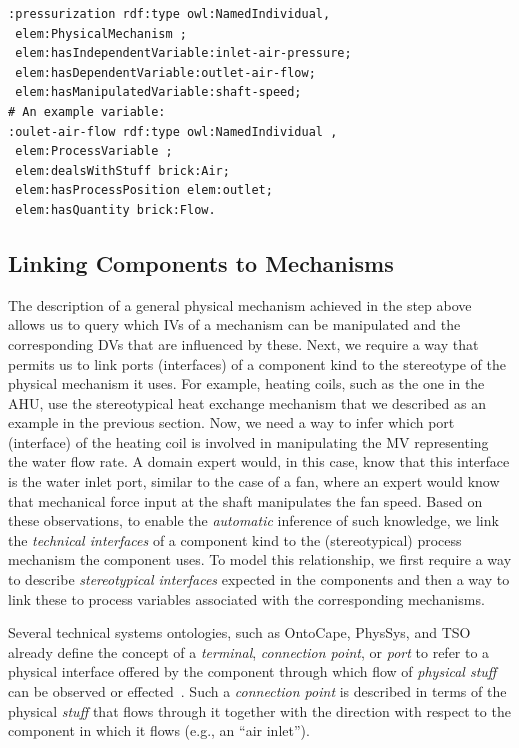 \documentclass[sigconf]{acmart}
\begin{document}
\begin{lstlisting}[language=SPARQL]
:pressurization rdf:type owl:NamedIndividual,
 elem:PhysicalMechanism ; 
 elem:hasIndependentVariable:inlet-air-pressure; 
 elem:hasDependentVariable:outlet-air-flow;
 elem:hasManipulatedVariable:shaft-speed;
# An example variable:
:oulet-air-flow rdf:type owl:NamedIndividual ,
 elem:ProcessVariable ;
 elem:dealsWithStuff brick:Air;
 elem:hasProcessPosition elem:outlet;
 elem:hasQuantity brick:Flow.
\end{lstlisting}

\subsection{Linking Components to Mechanisms}

The description of a general physical mechanism achieved in the step above allows us to query which IVs of a mechanism can be manipulated and the corresponding DVs that are influenced by these.
Next, we require a way that permits us to link ports (interfaces) of a component kind to the stereotype of the physical mechanism it uses. 
For example, heating coils, such as the one in the AHU, use the stereotypical heat exchange mechanism that we described as an example in the previous section.
Now, we need a way to infer which port (interface) of the heating coil is involved in manipulating the MV representing the water flow rate.
A domain expert would, in this case, know that this interface is the water inlet port, similar to the case of a fan, where an expert would know that mechanical force input at the shaft manipulates the fan speed.
Based on these observations, to enable the \emph{automatic} inference of such knowledge, we link the \emph{technical interfaces} of a component kind to the (stereotypical) process mechanism the component uses.
To model this relationship, we first require a way to describe \textit{stereotypical interfaces} expected in the components and then a way to link these to process variables associated with the corresponding mechanisms.

Several technical systems ontologies, such as OntoCape, PhysSys, and TSO already define the concept of a \textit{terminal}, \textit{connection point}, or \textit{port} to refer to a physical interface offered by the component through which flow of \textit{physical stuff} can be observed or effected~\cite{borst1995physsys,morbach2009ontocape,sd_pauen2021tubes}.
Such a \textit{connection point} is described in terms of the physical \textit{stuff} that flows through it together with the direction with respect to the component in which it flows (e.g., an ``air inlet'').
\end{document}
